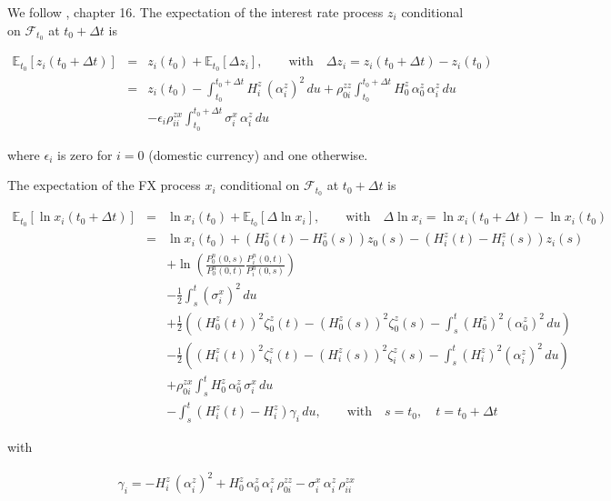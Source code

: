 \documentclass[12pt, a4paper]{article}
\begin{document}
{{\begin{appendix}
We follow \cite{Lichters}, chapter 16. The expectation of the interest rate process $z_i$ conditional on $\mathcal{F}_{t_0}$ at $t_0+\Delta t$ is

\begin{eqnarray*}
  \mathbb{E}_{t_0}[z_i(t_0+\Delta t)] &=& z_i(t_0) + \mathbb{E}_{t_0}[\Delta z_i],
  \qquad\mbox{with}\quad \Delta z_i = z_i(t_0+\Delta t) - z_i(t_0) \\
  &=& z_i(t_0) -\int_{t_0}^{t_0+\Delta t} H^z_i\,(\alpha^z_i)^2\,du + \rho^{zz}_{0i} \int_{t_0}^{t_0+\Delta t}
  H^z_0\,\alpha^z_0\,\alpha^z_i\,du \\
  & & - \epsilon_i  \rho^{zx}_{ii}\int_{t_0}^{t_0+\Delta t} \sigma_i^x\,\alpha^z_i\,du
\end{eqnarray*}

where $\epsilon_i$ is zero for $i=0$ (domestic currency) and one otherwise.

\bigskip

The expectation of the FX process $x_i$ conditional on $\mathcal{F}_{t_0}$ at $t_0+\Delta t$ is

\begin{eqnarray*}
  \mathbb{E}_{t_0}[\ln x_i(t_0+\Delta t)] &=& \ln x_i(t_0) +  \mathbb{E}_{t_0}[\Delta \ln x_i],
  \qquad\mbox{with}\quad \Delta \ln x_i = \ln x_i(t_0+\Delta t) - \ln x_i(t_0) \\
  &=& \ln x_i(t_0) + \left(H^z_0(t)-H^z_0(s)\right) z_0(s) -\left(H^z_i(t)-H^z_i(s)\right)z_i(s)\\
  &&+ \ln \left( \frac{P^n_0(0,s)}{P^n_0(0,t)} \frac{P^n_i(0,t)}{P^n_i(0,s)}\right) \\
  && - \frac12 \int_s^t (\sigma^x_i)^2\,du \\
  &&+\frac12 \left((H^z_0(t))^2 \zeta^z_0(t) -  (H^z_0(s))^2 \zeta^z_0(s)- \int_s^t (H^z_0)^2
  (\alpha^z_0)^2\,du\right)\\
  &&-\frac12 \left((H^z_i(t))^2 \zeta^z_i(t) -  (H^z_i(s))^2 \zeta^z_i(s)-\int_s^t (H^z_i)^2 (\alpha^z_i)^2\,du
  \right)\\
  && + \rho^{zx}_{0i} \int_s^t H^z_0\, \alpha^z_0\, \sigma^x_i\,du \\
  &&  - \int_s^t \left(H^z_i(t)-H^z_i\right)\gamma_i \,du, \qquad\mbox{with}\quad s = t_0, \quad t = t_0+\Delta t
\end{eqnarray*}

with

\begin{eqnarray*}
  \gamma_i = -H^z_i\,(\alpha^z_i)^2  + H^z_0\,\alpha^z_0\,\alpha^z_i\,\rho^{zz}_{0i} - \sigma_i^x\,\alpha^z_i\,
  \rho^{zx}_{ii}
\end{eqnarray*}


\end{appendix}}}
\end{document}
